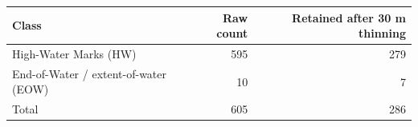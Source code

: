 \begin{tabular}{lrr}
\toprule
Class & Raw count & Retained after 30 m thinning \\
\midrule
High-Water Marks (HW) & 595 & 279 \\
End-of-Water / extent-of-water (EOW) & 10 & 7 \\
Total & 605 & 286 \\
\bottomrule
\end{tabular}
